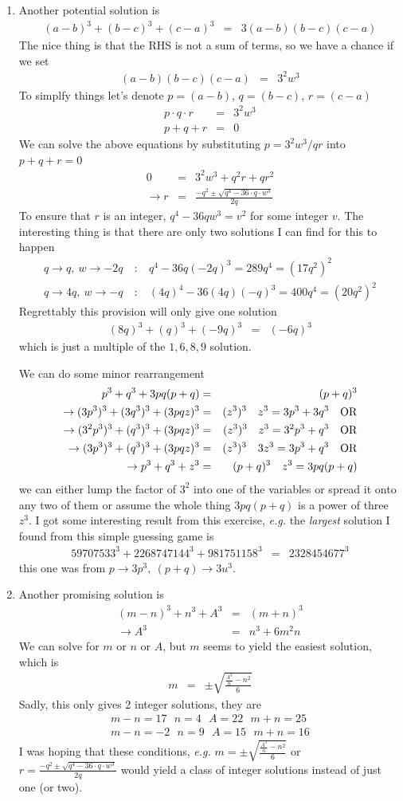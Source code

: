 \documentclass[aps,preprint,preprintnumbers,nofootinbib,showpacs,prd]{revtex4-1}
\newcommand{\eg}{{\it e.g.} }
\newcommand{\nbea}{\begin{eqnarray*}}
\newcommand{\neea}{\end{eqnarray*}}
\begin{document}
\begin{enumerate}
\item Another potential solution is
%
\nbea
(a-b)^3 + (b-c)^3 + (c-a)^3 & = & 3 (a-b)(b-c)(c-a)
\neea
%
The nice thing is that the RHS is not a sum of terms, so we have a chance if we set
%
\nbea
(a-b)(b-c)(c-a) & = & 3^2 w^3
\neea
%
To simplfy things let's denote $p = (a-b)$, $q = (b-c)$, $r = (c-a)$
%
\nbea
p \cdot q \cdot r & = & 3^2 w^3\\
p + q+ r & = & 0
\neea
%
We can solve the above equations by substituting $p = 3^2 w^3/qr$ into $p + q+ r = 0$
%
\nbea
0 & = & 3^2 w^3 + q^2 r + q r^2 \\
\rightarrow r & = & \frac{-q^2 \pm \sqrt{q^4 - 36 \cdot q \cdot w^3}}{2 q}
\neea
%
To ensure that $r$ is an integer, $q^4 - 36 q w^3 = v^2$ for some integer $v$. The interesting thing is that there are only two solutions I can find for this to happen
%
\nbea
q \rightarrow q,~w\rightarrow -2q & ~:~ & q^4 - 36 q (-2q)^3 = 289 q^4 = (17 q^2)^2 \\
q \rightarrow 4q,~w\rightarrow -q & ~:~ & (4q)^4 - 36 (4q) (-q)^3 = 400 q^4 = (20 q^2)^2 
\neea
%
Regrettably this provision will only give one solution
%
\nbea
(8q)^3 + (q)^3 + (-9q)^3 & = & (-6q)^3
\neea
%
which is just a multiple of the $1,6,8,9$ solution.

We can do some minor rearrangement
%
\nbea
p^3 + q^3 + 3 p q (p+q) & = & (p+q)^3 \\
\to (3p^3)^3 + (3q^3)^3 + (3 p q z)^3 & = & (z^3)^3 ~~~z^3 = 3p^3 + 3q^3~~~{\rm OR}\\
\to (3^2p^3)^3 + (q^3)^3 + (3 p q z)^3 & = & (z^3)^3~~~z^3 = 3^2p^3 + q^3~~~{\rm OR}\\
\to (3p^3)^3 + (q^3)^3 + (3 p q z)^3 & = & (z^3)^3~~~3z^3 = 3p^3 + q^3~~~{\rm OR}\\
\to p^3 + q^3 + z^3 & = & (p+q)^3~~~z^3 = 3 p q(p+q)
\neea
%
we can either lump the factor of $3^2$ into one of the variables or spread it onto any two of them or  assume the whole thing $3 p q(p+q)$ is a power of three $z^3$. I got some interesting result from this exercise, \eg the {\it largest} solution I found from this simple guessing game is
%
\nbea
59707533^3 + 2268747144^3 + 981751158^3 & = & 2328454677^3
\neea
%
this one was from $p \to 3 p^3, ~ (p+q) \to 3 u^3$.

\item Another promising solution is 
%
\nbea
(m-n)^3 + n^3 + A^3 & = & (m+n)^3 \\
\rightarrow A^3 & = & n^3 + 6 m^2 n
\neea
%
We can solve for $m$ or $n$ or $A$, but $m$ seems to yield the easiest solution, which is
%
\nbea
m & = & \pm \sqrt{\frac{\frac{A^3}{n} - n^2}{6}}
\neea
%
Sadly, this only gives 2 integer solutions, they are
%
\nbea
m-n = 17 ~~~ n = 4 ~~~ A = 22 ~~~ m+n = 25 \\
m-n = -2 ~~~ n = 9 ~~~ A = 15 ~~~ m+n = 16
\neea
%
I was hoping that these conditions, \eg $m = \pm \sqrt{\frac{\frac{A^3}{n} - n^2}{6}}$ or $r = \frac{-q^2 \pm \sqrt{q^4 - 36 \cdot q \cdot w^3}}{2 q}$ would yield a class of integer solutions instead of just one (or two).


\end{enumerate}
\end{document}
